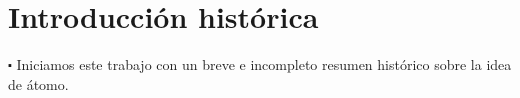 %
%
%
%
%
%
%
%
%

\section{Introducción histórica} 

$\centerdot$ Iniciamos este trabajo con un breve e incompleto resumen histórico sobre la idea de átomo.

